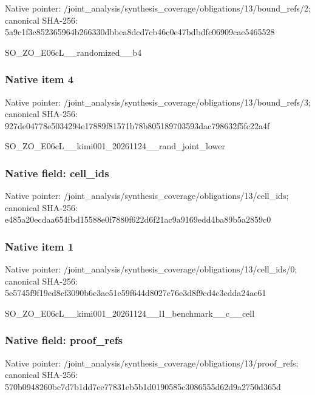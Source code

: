 \documentclass[10pt,a4paper]{article}
\begin{document}
Native pointer: /joint\_analysis/synthesi\allowbreak{}s\_coverage/obligations/1\allowbreak{}3/bound\_refs/2; canonical SHA-256: 5a9c1f3c852365964b266330\allowbreak{}dbbea8dcd7cb46c0e47bdbdf\allowbreak{}c06909cae5465528


SO\_ZO\_E06cL\_\_randomized\_\_b4


\subsubsection{Native item 4}


Native pointer: /joint\_analysis/synthesi\allowbreak{}s\_coverage/obligations/1\allowbreak{}3/bound\_refs/3; canonical SHA-256: 927de04778e5034294e17889\allowbreak{}f81571b78b805189703593da\allowbreak{}c798632f5fc22a4f


SO\_ZO\_E06cL\_\_kimi001\_202\allowbreak{}61124\_\_rand\_joint\_lower


\subsubsection{Native field: cell\_ids}


Native pointer: /joint\_analysis/synthesi\allowbreak{}s\_coverage/obligations/1\allowbreak{}3/cell\_ids; canonical SHA-256: e485a20ecdaa654fbd15588e\allowbreak{}0f7880f622d6f21ac9a9169e\allowbreak{}dd4ba89b5a2859c0



\subsubsection{Native item 1}


Native pointer: /joint\_analysis/synthesi\allowbreak{}s\_coverage/obligations/1\allowbreak{}3/cell\_ids/0; canonical SHA-256: 5e5745f9f19cd8cf3090b6c3\allowbreak{}ae51e59f644d8027c76e3d8f\allowbreak{}9cd4c3cdda24ae61


SO\_ZO\_E06cL\_\_kimi001\_202\allowbreak{}61124\_\_l1\_benchmark\_\_c\_\_\allowbreak{}cell


\subsubsection{Native field: proof\_refs}


Native pointer: /joint\_analysis/synthesi\allowbreak{}s\_coverage/obligations/1\allowbreak{}3/proof\_refs; canonical SHA-256: 570b0948260bc7d7b1dd7ee7\allowbreak{}7831eb5b1d0190585c308655\allowbreak{}5d62d9a2750d365d
\end{document}
